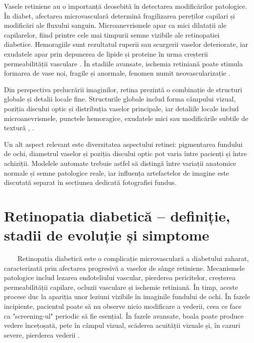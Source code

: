 \documentclass[12pt, a4paper, twoside, romanian]{teza-upb}
\begin{document}
\bigskip

Vasele retiniene au o importanță deosebită în detectarea modificărilor patologice. În diabet,
afectarea microvasculară determină fragilizarea pereților capilari și modificări ale fluxului sanguin. Microanevrismele
apar ca mici dilatații ale capilarelor, fiind printre cele mai timpurii semne
vizibile ale retinopatiei diabetice. Hemoragiile sunt rezultatul ruperii sau scurgerii vaselor deteriorate,
iar exudatele apar prin depunerea de lipide și proteine în urma creșterii
permeabilității vasculare \cite{16_giancardo2012exudate}. În stadiile avansate, ischemia retiniană poate stimula formarea de
vase noi, fragile și anormale, fenomen numit neovascularizație \cite{18_wong2016diabetic}.
\bigskip

Din perspectiva prelucrării imaginilor, retina prezintă o combinație de structuri globale și
detalii locale fine. Structurile globale includ forma câmpului vizual, poziția discului optic
și distribuția vaselor principale, iar detaliile locale includ microanevrismele, punctele hemoragice,
exudatele mici sau modificările subtile de textură \cite{1_niemeijer2005automatic}, \cite{2_sopharak2009automatic}.
\bigskip

Un alt aspect relevant este diversitatea aspectului retinei: pigmentarea fundului de ochi,
diametrul vaselor și poziția discului optic pot varia între pacienți și între
achiziții. Modelele automate trebuie astfel să distingă între variații anatomice normale și
semne patologice reale, iar influența artefactelor de imagine este discutată separat în
secțiunea dedicată fotografiei fundus.

\section{Retinopatia diabetică -- definiție, stadii de evoluție și simptome}

\ \ \ \ Retinopatia diabetică este o complicație microvasculară a diabetului zaharat, caracterizată prin afectarea
progresivă a vaselor de sânge retiniene. Mecanismele patologice includ lezarea endoteliului vascular,
pierderea pericitelor, creșterea permeabilității capilare, ocluzii vasculare și ischemie retiniană. În timp,
aceste procese duc la apariția unor leziuni vizibile în imaginile fundului de
ochi. În fazele incipiente, pacientul poate să nu observe nicio modificare a
vederii, ceea ce face ca "screening-ul" periodic să fie esențial. În fazele
avansate, boala poate produce vedere încețoșată, pete în câmpul vizual, scăderea acuității
vizuale și, în cazuri severe, pierderea vederii \cite{18_wong2016diabetic}.
\bigskip
\end{document}
